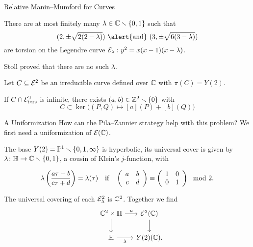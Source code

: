 \documentclass{beamer}
\begin{document}
\begin{frame}{Relative Manin--Mumford for Curves}
  
  \begin{theorem}
    There are at most finitely many $\lambda\in{\mathbb{C}}\smallsetminus\{0,1\}$ such
    that
    \begin{equation*}
      (2,\pm \sqrt{2(2-\lambda)}) \text{ \alert{and} } (3,\pm \sqrt{6(3-\lambda)})
    \end{equation*}
    are torsion on the Legendre curve ${\mathcal E}_\lambda : y^2 =
    x(x-1)(x-\lambda)$. 
  \end{theorem}

  Stoll proved that there are \alert{no} such $\lambda$.

  \begin{theorem}
    Let $C\subseteq{\mathcal E}^2$ be an irreducible curve  defined over ${\mathbb{C}}$ with
    $\pi(C)=Y(2)$.
    
    If $C\cap {\mathcal E}^2_{\mathrm{tors}}$ is
    \alert{infinite},  there exists $(a,b)\in{\mathbb{Z}}^2\smallsetminus\{0\}$ with
    \begin{equation*}
      C \subset \ker{\bigl((P,Q)\mapsto [a](P)+[b](Q)\bigr)} 
    \end{equation*}    
  \end{theorem} 
\end{frame}

\begin{frame}{A Uniformization}
  How can the Pila--Zannier strategy help with this problem?
  We  first need a uniformization of ${\mathcal E}({\mathbb{C}})$.

  The base $Y(2) ={\mathbb{P}}^{1}\smallsetminus\{0,1,\infty\}$ is hyperbolic, its
  universal cover is given by  $\lambda\colon {\mathbb{H}}\rightarrow
  {\mathbb{C}}\smallsetminus\{0,1\}$, a cousin of Klein's $j$-function, with

  \begin{equation*}
        \lambda\left(\frac{a\tau+b}{c\tau +d}\right) =
        \lambda(\tau)\quad\text{if}\quad
    \left( \begin{array}{cc} {a} & {b} \\ {c} & {d} \end{array} \right)   \equiv \left( \begin{array}{cc} {1} & {0} \\ {0} & {1} \end{array} \right) \mod 2.
  \end{equation*}
  
  The universal covering of each ${\mathcal E}^2_\lambda$ is ${\mathbb{C}}^2$.   Together we find
  \begin{equation*}
    \begin{tikzcd}[ampersand replacement=\&,column sep=small, row sep=small] 
      \& \IC^2\times\IH  \arrow{dd}{} \arrow{r}{u} \& \cE^2(\IC)\arrow{dd}{}\\
      \&  \&\\
      \&    \IH \arrow[swap]{r}{\lambda}  \& Y(2)(\IC).
    \end{tikzcd}
  \end{equation*}

\end{frame}
\end{document}
